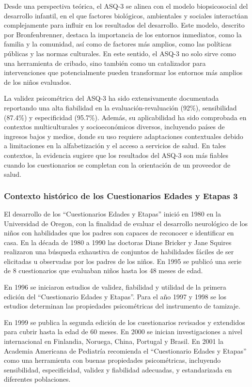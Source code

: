 \documentclass[11pt,letterpaper]{report}
\begin{document}
Desde una perspectiva teórica, el ASQ-3 se alinea con el modelo
biopsicosocial del desarrollo infantil, en el que factores biológicos,
ambientales y sociales interactúan complejamente para influir en los
resultados del desarrollo. Este modelo, descrito por Bronfenbrenner, destaca la
importancia de los entornos inmediatos, como la familia y la comunidad, así
como de factores más amplios, como las políticas públicas y las normas
culturales. En este sentido, el ASQ-3 no solo sirve como una herramienta de
cribado, sino también como un catalizador para intervenciones que
potencialmente pueden transformar los entornos más amplios de los niños
evaluados. \cite{Feldman3, Bronfenbrenner2005}

La validez psicométrica del ASQ-3 ha sido extensivamente documentada reportando
una alta fiabilidad en la evaluación-revaluación (92\%), sensibilidad (87.4\%)
y especificidad (95.7\%). Además, su aplicabilidad ha sido comprobada en
contextos multiculturales y socioeconómicos diversos, incluyendo países de
ingresos bajos y medios, donde su uso requiere adaptaciones contextuales debido
a limitaciones en la alfabetización y el acceso a servicios de salud. En tales
contextos, la evidencia sugiere que los resultados del ASQ-3 son más fiables
cuando los cuestionarios se completan con la orientación de un proveedor de
salud. \cite{Vameghi2013-uo, SarmientoCampos2010, Manasyan2023}

\subsubsection{Contexto histórico de los Cuestionarios Edades y Etapas 3}
El desarrollo de los ``Cuestionarios Edades y Etapas'' inició en 1980 en la
Universidad de Oregon, con la finalidad de evaluar el desarrollo neurológico de
los niños con habilidades que los padres son capaces de reconocer e identificar
en casa. En la década de 1980 a 1990 las doctoras Diane Bricker y Jane Squires
realizaron una búsqueda exhaustiva de conjuntos de habilidades fáciles de ser
elicitadas u observadas por los padres de los niños. En 1995 se publicó una
serie de 8 cuestionarios que evaluaban niños hasta los 48 meses de edad.
\cite{ASQ4decades}

En 1996 se iniciaron estudios de validez, fiabilidad y utilidad de la primera
edición del ``Cuestionario Edades y Etapas''. Para el año 1997 y 1998 se los
estudios determinan las propiedades psicométricas del instrumento de tamizaje.
\cite{ASQ4decades}

En 1999 se publica la segunda edición de los cuestionarios revisados y
extendidos para cubrir hasta la edad de 60 meses. En 2000 se inician
investigaciones a nivel internacional en Finlandia, Noruega, China, Portugal y
Brasil. En 2001 la Academia Americana de Pediatría recomienda el ``Cuestionario
Edades y Etapas'' como una herramienta con buenas propiedades psicométricas,
incluyendo sensibilidad, especificidad, validez y fiabilidad adecuadas, y
estandarizada en diferentes poblaciones. \cite{Pediatrics2001}
\end{document}
